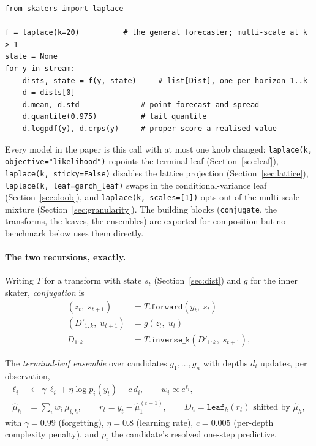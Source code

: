 \documentclass[article]{jss}
\providecommand{\code}[1]{\texttt{#1}}
\begin{document}
\begin{verbatim}
from skaters import laplace

f = laplace(k=20)          # the general forecaster; multi-scale at k > 1
state = None
for y in stream:
    dists, state = f(y, state)     # list[Dist], one per horizon 1..k
    d = dists[0]
    d.mean, d.std              # point forecast and spread
    d.quantile(0.975)          # tail quantile
    d.logpdf(y), d.crps(y)     # proper-score a realised value
\end{verbatim}

\noindent Every model in the paper is this call with at most one knob changed:
\code{laplace(k, objective="likelihood")} repoints the terminal leaf
(Section~\ref{sec:leaf}), \code{laplace(k, sticky=False)} disables the lattice
projection (Section~\ref{sec:lattice}), \code{laplace(k, leaf=garch\_leaf)}
swaps in the conditional-variance leaf (Section~\ref{sec:doob}), and
\code{laplace(k, scales=[1])} opts out of the multi-scale mixture
(Section~\ref{sec:granularity}). The building blocks (\code{conjugate}, the
transforms, the leaves, the ensembles) are exported for composition but no
benchmark below uses them directly.

\paragraph{The two recursions, exactly.}
Writing $T$ for a transform with state $s_t$ (Section~\ref{sec:dist}) and $g$
for the inner skater, \emph{conjugation} is
\begin{align*}
(z_t,\; s_{t+1}) &= T.\code{forward}(y_t,\; s_t) \\
(D'_{1:k},\; u_{t+1}) &= g(z_t,\; u_t) \\
D_{1:k} &= T.\code{inverse\_k}(D'_{1:k},\; s_{t+1}),
\end{align*}

The \emph{terminal-leaf ensemble} over candidates $g_1,\dots,g_n$ with
depths $d_i$ updates, per observation,
\begin{align*}
\ell_i &\leftarrow \gamma\,\ell_i + \eta \log p_i(y_t) - c\,d_i,
  \qquad w_i \propto e^{\ell_i}, \\
\hat\mu_h &= \textstyle\sum_i w_i\, \mu_{i,h}, \qquad
r_t = y_t - \hat\mu_{1}^{(t-1)}, \qquad
D_h = \code{leaf}_h(r_t) \text{ shifted by } \hat\mu_h,
\end{align*}
with $\gamma = 0.99$ (forgetting), $\eta = 0.8$ (learning rate), $c = 0.005$
(per-depth complexity penalty), and $p_i$ the candidate's resolved one-step
predictive.
\end{document}
